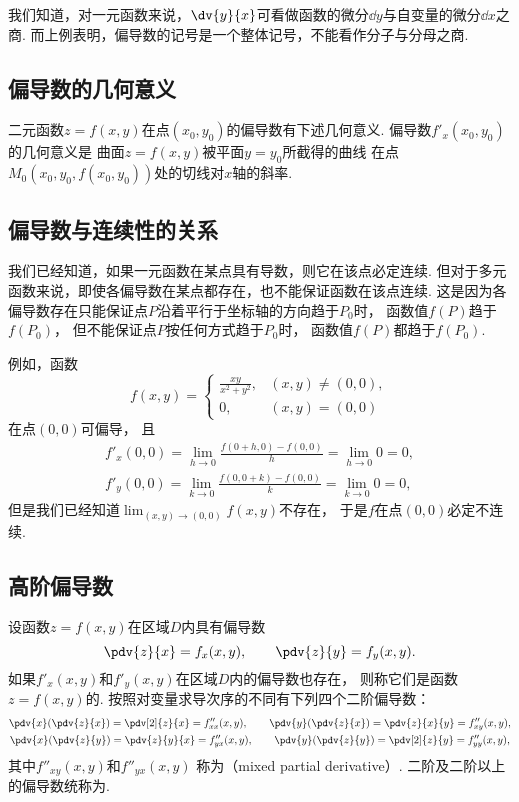 我们知道，对一元函数来说，\(\dv{y}{x}\)可看做函数的微分\(\dd{y}\)与自变量的微分\(\dd{x}\)之商.
而上例表明，偏导数的记号是一个整体记号，不能看作分子与分母之商.

\subsection{偏导数的几何意义}
二元函数\(z=f(x,y)\)在点\((x_0,y_0)\)的偏导数有下述几何意义.
偏导数\(f'_x(x_0,y_0)\)的几何意义是
曲面\(z=f(x,y)\)被平面\(y=y_0\)所截得的曲线
在点\(M_0(x_0,y_0,f(x_0,y_0))\)处的切线对\(x\)轴的斜率.

\subsection{偏导数与连续性的关系}
我们已经知道，如果一元函数在某点具有导数，则它在该点必定连续.
但对于多元函数来说，即使各偏导数在某点都存在，也不能保证函数在该点连续.
这是因为各偏导数存在只能保证点\(P\)沿着平行于坐标轴的方向趋于\(P_0\)时，
函数值\(f(P)\)趋于\(f(P_0)\)，
但不能保证点\(P\)按任何方式趋于\(P_0\)时，
函数值\(f(P)\)都趋于\(f(P_0)\).

例如，函数\begin{equation*}
	f(x,y) = \left\{ \begin{array}{cl}
		\frac{xy}{x^2+y^2}, & (x,y)\neq(0,0), \\
		0, & (x,y)=(0,0)
	\end{array} \right.
\end{equation*}
在点\((0,0)\)可偏导，
且\begin{gather*}
	f'_x(0,0) = \lim_{h\to0} \frac{f(0+h,0) - f(0,0)}{h} = \lim_{h\to0} 0 = 0, \\
	f'_y(0,0) = \lim_{k\to0} \frac{f(0,0+k) - f(0,0)}{k} = \lim_{k\to0} 0 = 0,
\end{gather*}
但是我们已经知道\(\lim_{(x,y)\to(0,0)} f(x,y)\)不存在，
于是\(f\)在点\((0,0)\)必定不连续.

\subsection{高阶偏导数}
\begin{definition}
设函数\(z=f(x,y)\)在区域\(D\)内具有偏导数\begin{equation*}
	\pdv{z}{x} = f_x(x,y), \qquad
	\pdv{z}{y} = f_y(x,y).
\end{equation*}
如果\(f'_x(x,y)\)和\(f'_y(x,y)\)在区域\(D\)内的偏导数也存在，
则称它们是函数\(z=f(x,y)\)的.
按照对变量求导次序的不同有下列四个二阶偏导数：
\begin{gather*}
	\pdv{x}(\pdv{z}{x}) = \pdv[2]{z}{x} = f''_{xx}(x,y),
	\qquad
	\pdv{y}(\pdv{z}{x}) = \pdv{z}{x}{y} = f''_{xy}(x,y), \\
	\pdv{x}(\pdv{z}{y}) = \pdv{z}{y}{x} = f''_{yx}(x,y),
	\qquad
	\pdv{y}(\pdv{z}{y}) = \pdv[2]{z}{y} = f''_{yy}(x,y),
\end{gather*}
其中\(f''_{xy}(x,y)\)和\(f''_{yx}(x,y)\)
称为（mixed partial derivative）.
二阶及二阶以上的偏导数统称为.
\end{definition}

